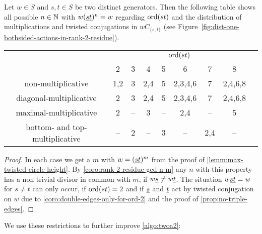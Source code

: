 \begin{coro}
	Let $w \in S$ and $s,t \in S$ be two distinct generators. Then the following table shows all possible $n \in \mathbb{N}$ with $w(\underline{s} \underline{t})^n = w$ regarding $\operatorname{ord}(st)$ and the distribution of multiplications and twisted conjugations in $wC_{\{s,t\}}$ (see Figure~\ref{fig:dist-one-bothsided-actions-in-rank-2-residue}).

	\begin{center}
		\begin{tabular}{c|ccccccc|c}
													& \multicolumn{7}{c|}{$\operatorname{ord}(st)$} \\
													& 2 & 3 & 4 & 5 & 6 & 7 & 8 \\
			\hline
			\textrm{non-multiplicative}				& 1,2 & 3 & 2,4 & 5 & 2,3,4,6 & 7 & 2,4,6,8 \\
			\textrm{diagonal-multiplicative}		& 2 & 3 & 2,4 & 5 & 2,3,4,6 & 7 & 2,4,6,8 \\
			\textrm{maximal-multiplicative}			& 2 & -- & 3 & -- & 2,4 & -- & 5 \\
			\textrm{bottom- and top-multiplicative}	& -- & 2 & -- & 3 & -- & 2,4 & -- \\
		\end{tabular}		
	\end{center}

	\begin{proof}
		In each case we get a $m$ with $w = (\underline{s} \underline{t})^m$ from the proof of \ref{lemm:max-twisted-circle-height}. By \ref{coro:rank-2-residue-gcd-n-m} any $n$ with this property has a non trivial divisor in common with $m$, if $w \underline{s} \neq w \underline{t}$. The situation $w \underline{s} \underline{t} = w$ for $s \neq t$ can only occur, if $\operatorname{ord}(st) = 2$ and if $\underline{s}$ and $\underline{t}$ act by twisted conjugation on $w$ due to \ref{coro:double-edges-only-for-ord-2} and the proof of \ref{prop:no-triple-edges}.
	\end{proof}
\end{coro}

We use these restrictions to further improve \ref{algo:twoa2}:


